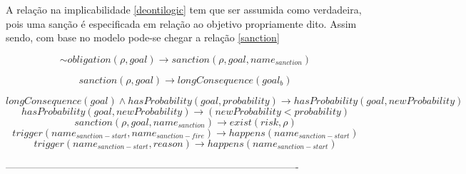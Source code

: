 \documentclass[a0,portrait]{a0poster}
\begin{document}
\begin{multicols}{2}
A relação na implicabilidade \ref{deontilogic} tem que ser assumida como verdadeira, pois uma sanção é especificada em 
relação ao objetivo propriamente dito. Assim sendo, com base no modelo pode-se chegar a relação \ref{sanction}

\begin{equation}\label{sanction}
	\sim obligation(\rho,goal) \to sanction(\rho,goal,name_{sanction})
\end{equation}

\begin{equation}\label{lconsequence}
	sanction(\rho,goal) \to longConsequence(goal_{b}) 
\end{equation}

\begin{equation}\label{lconsequencen1}
	longConsequence(goal) \wedge hasProbability(goal,probability) \to hasProbability(goal,newProbability)
\end{equation}
\begin{equation}\label{lconsequencen2}
	 hasProbability(goal,newProbability)\to (newProbability < probability)
\end{equation}
\begin{equation}\label{risk}
	sanction(\rho,goal,name_{sanction}) \to exist(risk,\rho) 
\end{equation}
\begin{equation}\label{sanctionTrigger}
		  trigger(name_{sanction-start},name_{sanction-fire}) \to happens(name_{sanction-start})
\end{equation}
\begin{equation}\label{sanctionTrigger02}
		  trigger(name_{sanction-start},reason) \to happens(name_{sanction-start})
\end{equation}


----------------------------------------------------------------------------------------

\end{multicols}
\end{document}
